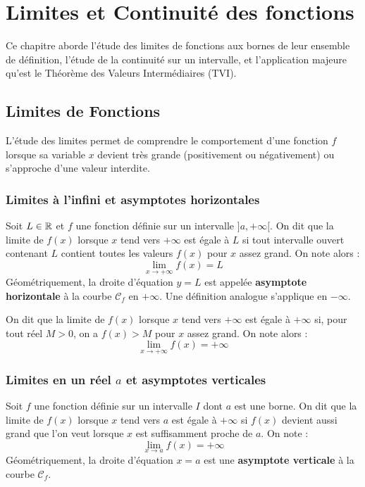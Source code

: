\chapter{Limites et Continuité des fonctions}

Ce chapitre aborde l'étude des limites de fonctions aux bornes de leur ensemble de définition, l'étude de la continuité sur un intervalle, et l'application majeure qu'est le Théorème des Valeurs Intermédiaires (TVI).

\section{Limites de Fonctions}

L'étude des limites permet de comprendre le comportement d'une fonction $f$ lorsque sa variable $x$ devient très grande (positivement ou négativement) ou s'approche d'une valeur interdite.

\subsection{Limites à l'infini et asymptotes horizontales}

\begin{definition}
Soit $L \in \mathbb{R}$ et $f$ une fonction définie sur un intervalle $]a, +\infty[$.
On dit que la limite de $f(x)$ lorsque $x$ tend vers $+\infty$ est égale à $L$ si tout intervalle ouvert contenant $L$ contient toutes les valeurs $f(x)$ pour $x$ assez grand. On note alors :
\[
\lim_{x \to +\infty} f(x) = L
\]
Géométriquement, la droite d'équation $y = L$ est appelée \textbf{asymptote horizontale} à la courbe $\mathcal{C}_f$ en $+\infty$.
Une définition analogue s'applique en $-\infty$.
\end{definition}

\begin{definition}
On dit que la limite de $f(x)$ lorsque $x$ tend vers $+\infty$ est égale à $+\infty$ si, pour tout réel $M > 0$, on a $f(x) > M$ pour $x$ assez grand. On note alors :
\[
\lim_{x \to +\infty} f(x) = +\infty
\]
\end{definition}

\subsection{Limites en un réel $a$ et asymptotes verticales}

\begin{definition}
Soit $f$ une fonction définie sur un intervalle $I$ dont $a$ est une borne.
On dit que la limite de $f(x)$ lorsque $x$ tend vers $a$ est égale à $+\infty$ si $f(x)$ devient aussi grand que l'on veut lorsque $x$ est suffisamment proche de $a$. On note :
\[
\lim_{x \to a} f(x) = +\infty
\]
Géométriquement, la droite d'équation $x = a$ est une \textbf{asymptote verticale} à la courbe $\mathcal{C}_f$.
\end{definition}

